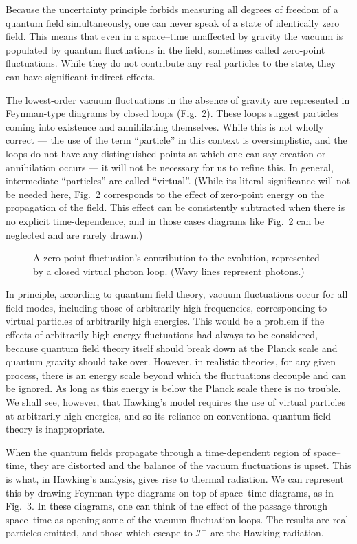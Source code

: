 \documentclass[12pt]{article}
\def\scrif{{\mathcal I}^+}
\begin{document}
Because the uncertainty principle forbids measuring all degrees of freedom of a
quantum field simultaneously, one can never speak of a state of identically
zero field.  This means that even in a space--time unaffected by gravity the
vacuum is populated by quantum fluctuations in the field, sometimes called
zero-point fluctuations.  While they do not contribute any real particles to
the state, they can have significant indirect effects.

The lowest-order vacuum fluctuations in the absence of gravity are represented
in Feynman-type  diagrams by closed loops (Fig.~2).  These loops suggest
particles coming into existence and annihilating themselves.  While this is not
wholly correct --- the use of the term ``particle'' in this context is
oversimplistic, and the loops do not have any distinguished points at which one
can say creation or annihilation occurs --- it will not be necessary for us to
refine this.  In general, intermediate ``particles'' are called ``virtual''.
(While its literal significance will not be needed here, Fig.~2 corresponds to
the effect of zero-point energy  on the propagation of the field.  This effect
can be consistently subtracted when there is no explicit time-dependence, and
in those cases diagrams like Fig.~2 can  be neglected and are rarely drawn.)

\begin{figure}
\epsfxsize=1in
\caption{A zero-point fluctuation's contribution to the evolution,
represented by a closed virtual photon loop. (Wavy lines represent photons.)
}
\end{figure}

In principle, according to quantum field theory, vacuum fluctuations occur for
all field modes, including those of arbitrarily high frequencies, corresponding
to virtual particles of arbitrarily high energies.    This would be a problem
if the effects of arbitrarily high-energy fluctuations had always to be
considered, because quantum field theory itself should break down at the Planck
scale and quantum gravity should take over.  However, in realistic
theories, for any given process, there is an energy scale beyond which
the fluctuations decouple and can be ignored.  As long as this energy
is below the Planck scale there is no trouble.
We shall see, however, that Hawking's model requires the use of virtual
particles at arbitrarily high energies, and so its reliance on conventional
quantum field theory is inappropriate.


When the quantum fields propagate through a time-dependent region of
space--time, they are distorted and the balance of the vacuum fluctuations is
upset.  This is what, in Hawking's analysis, gives rise to thermal radiation. 
We can represent this by drawing Feynman-type diagrams on top of space--time
diagrams, as in Fig.~3.  In these diagrams, one can think of the effect of the
passage through space--time as opening some of the vacuum fluctuation loops. 
The results are real particles emitted, and those which escape to $\scrif$ are
the Hawking radiation.  
\end{document}
